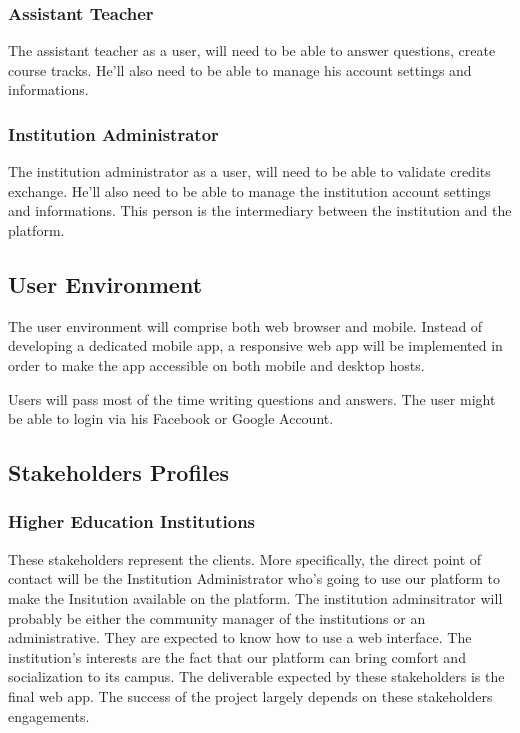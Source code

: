\documentclass[12pt,a4paper,oneside, titlepage]{article}
\begin{document}
	    \subsubsection{Assistant Teacher}
	     The assistant teacher as a user, will need to be able to answer questions, create course tracks. He'll also
	     need to be able to manage his account settings and informations.
	     
        \subsubsection{Institution Administrator}
        The institution administrator as a user, will need to be able to validate credits exchange. He'll also
	    need to be able to manage the institution account settings and informations. This person is the intermediary
	    between the institution and the platform.
	    
	    
	\subsection{User Environment}
	The user environment will comprise both web browser and mobile. Instead of developing a dedicated mobile app, a 
	responsive web app will be implemented in order to make the app accessible on both mobile and desktop hosts. \newline
	
	Users will pass most of the time writing questions and answers. The user might be able to login via his Facebook or 
	Google Account.
	
	\newpage 
	
	\subsection{Stakeholders Profiles}
	    \subsubsection{Higher Education Institutions}
	    These stakeholders represent the clients. More specifically, the direct point of contact will be the Institution
	    Administrator who's going to use our platform to make the Insitution available on the platform. The institution 
	    adminsitrator will probably be either the community manager of the institutions or an administrative. They are 
	    expected to know how to use a web interface. The institution's interests are the fact that our platform can bring
	    comfort and socialization to its campus. The deliverable expected by these stakeholders is the final web app. The
	    success of the project largely depends on these stakeholders engagements.
	    
\end{document}
